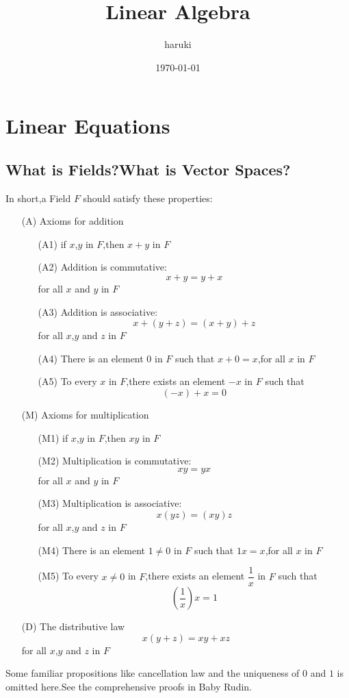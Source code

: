\documentclass{article}
\title{Linear Algebra}
\author{haruki}
\date{\today}
\begin{document}
\maketitle
\tableofcontents
\section{Linear Equations}\label{1}
\subsection{What is Fields?What is Vector Spaces?}
\noindent In short,a Field $F$ should satisfy these properties:
\begin{enumerate}
	\item[(A)] Axioms for addition
	\begin{enumerate}
		\item[(A1)] if $x$,$y$ in $F$,then $x+y$ in $F$
	    \item[(A2)] Addition is commutative:\[x+y=y+x\]for all $x$ and $y$ in $F$
	    \item[(A3)] Addition is associative:\[x+(y+z)=(x+y)+z\]for all $x$,$y$ and $z$ in $F$
	    \item[(A4)] There is an element $0$ in $F$ such that $x+0=x$,for all $x$ in $F$
	    \item[(A5)] To every $x$ in $F$,there exists an element $-x$ in $F$ such that \[(-x)+x=0\]
	\end{enumerate}
	\item[(M)] Axioms for multiplication
	\begin{enumerate}
		\item[(M1)] if $x$,$y$ in $F$,then $xy$ in $F$
		\item[(M2)] Multiplication is commutative:\[xy=yx\]for all $x$ and $y$ in $F$
		\item[(M3)] Multiplication is associative:\[x(yz)=(xy)z\]for all $x$,$y$ and $z$ in $F$
		\item[(M4)] There is an element $1\neq 0$ in $F$ such that $1x=x$,for all $x$ in $F$
		\item[(M5)] To every $x\neq 0$ in $F$,there exists an element $\dfrac{1}{x}$ in $F$ such that \[(\frac{1}{x})x=1\]
	\end{enumerate}
	\item[(D)] The distributive law\[x(y+z)=xy+xz\]for all $x$,$y$ and $z$ in $F$
\end{enumerate}
\indent Some familiar propositions like cancellation law and the uniqueness of $0$ and $1$ is omitted here.See the comprehensive proofs in Baby Rudin.\\
\end{document}
